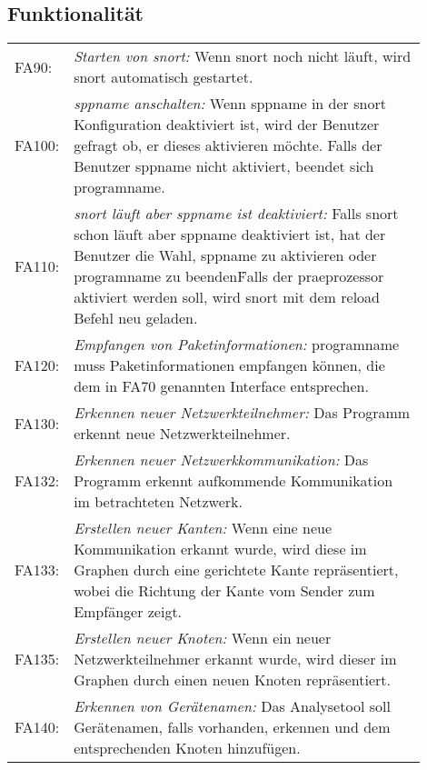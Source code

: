 \subsection{Funktionalität}

\begin{longtable}{lp{0.9\linewidth}}

FA90: & \textit{Starten von \gls{snort}: }Wenn \gls{snort} noch nicht läuft, wird \gls{snort} automatisch gestartet. \\

FA100: & \textit{\gls{sppname} anschalten: }Wenn \gls{sppname} in der \gls{snort} Konfiguration deaktiviert ist, wird der Benutzer gefragt ob, er dieses aktivieren möchte. Falls der Benutzer \gls{sppname} nicht aktiviert, beendet sich \gls{programname}. \\

FA110: & \textit{\gls{snort} läuft aber \gls{sppname} ist deaktiviert: }Falls \gls{snort} schon läuft aber \gls{sppname} deaktiviert ist, hat der Benutzer die Wahl, \gls{sppname} zu aktivieren oder \gls{programname} zu beenden\. Falls der \gls{praeprozessor} aktiviert werden soll, wird \gls{snort} mit dem reload Befehl neu geladen. \\

FA120: & \textit{Empfangen von Paketinformationen: }\gls{programname} muss Paketinformationen empfangen können, die dem in FA70 genannten Interface entsprechen. \\

FA130: & \textit{Erkennen neuer Netzwerkteilnehmer: }Das Programm erkennt neue Netzwerkteilnehmer. \\

FA132: & \textit{Erkennen neuer Netzwerkkommunikation: }Das Programm erkennt aufkommende Kommunikation im betrachteten Netzwerk. \\

FA133: & \textit{Erstellen neuer Kanten: }Wenn eine neue Kommunikation erkannt wurde, wird diese im Graphen durch eine gerichtete Kante repräsentiert, wobei die Richtung der Kante vom Sender zum Empfänger zeigt. \\

FA135: & \textit{Erstellen neuer Knoten: }Wenn ein neuer Netzwerkteilnehmer erkannt wurde, wird dieser im Graphen durch einen neuen Knoten repräsentiert. \\

FA140: & \textit{Erkennen von Gerätenamen: }Das Analysetool soll Gerätenamen, falls vorhanden, erkennen und dem entsprechenden Knoten hinzufügen. \\


\end{longtable}
